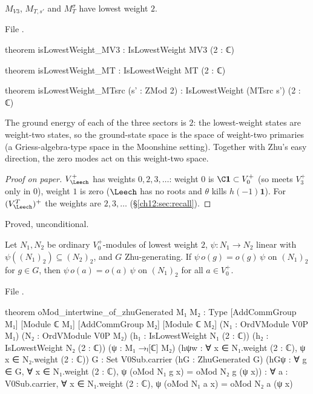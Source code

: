 \begin{theorem}\label{ch12:thm:lowest}
$M_{V3}$, $M_{T,s'}$ and $M_T^\sigma$ have lowest weight $2$.
\end{theorem}
File .
\begin{leancode}
theorem isLowestWeight_MV3 : IsLowestWeight MV3 (2 : ℂ)

theorem isLowestWeight_MT : IsLowestWeight MT (2 : ℂ)

theorem isLowestWeight_MTsrc (s' : ZMod 2) : IsLowestWeight (MTsrc s') (2 : ℂ)
\end{leancode}

\begin{physics}
The ground energy of each of the three sectors is $2$: the lowest-weight states are weight-two states, so the ground-state space is the space of weight-two primaries (a Griess-algebra-type space in the Moonshine setting). Together with Zhu's easy direction, the zero modes act on this weight-two space.
\end{physics}
\begin{proof}[Proof on paper]
$V_\Leech^+$ has weights $0,2,3,\dots$: weight $0$ is $\C\mathbf 1\subset V_0^+$ (so meets $V_3^+$ only in
$0$), weight $1$ is zero ($\Leech$ has no roots and $\theta$ kills $h(-1)\mathbf 1$).  For
$(V_\Leech^T)^+$ the weights are $2,3,\dots$ (\S\ref{ch12:sec:recall}).
\end{proof}
\begin{status}Proved, unconditional.\end{status}

\begin{theorem}\label{ch12:thm:oMod_intertwine}
Let $N_1,N_2$ be ordinary $V_0^+$-modules of lowest weight $2$, $\psi:N_1\to N_2$ linear with
$\psi((N_1)_2)\subseteq(N_2)_2$, and $G$ Zhu-generating.  If $\psi\,o(g)=o(g)\,\psi$ on $(N_1)_2$ for
$g\in G$, then $\psi\,o(a)=o(a)\,\psi$ on $(N_1)_2$ for all $a\in V_0^+$.
\end{theorem}
File .
\begin{leancode}
theorem oMod_intertwine_of_zhuGenerated {M₁ M₂ : Type} [AddCommGroup M₁] [Module ℂ M₁]
    [AddCommGroup M₂] [Module ℂ M₂] (N₁ : OrdVModule V0P M₁) (N₂ : OrdVModule V0P M₂)
    (h₁ : IsLowestWeight N₁ (2 : ℂ)) (h₂ : IsLowestWeight N₂ (2 : ℂ)) (ψ : M₁ →ₗ[ℂ] M₂)
    (hψw : ∀ x ∈ N₁.weight (2 : ℂ), ψ x ∈ N₂.weight (2 : ℂ)) {G : Set V0Sub.carrier}
    (hG : ZhuGenerated G)
    (hGψ : ∀ g ∈ G, ∀ x ∈ N₁.weight (2 : ℂ), ψ (oMod N₁ g x) = oMod N₂ g (ψ x)) :
    ∀ a : V0Sub.carrier, ∀ x ∈ N₁.weight (2 : ℂ), ψ (oMod N₁ a x) = oMod N₂ a (ψ x)
\end{leancode}

